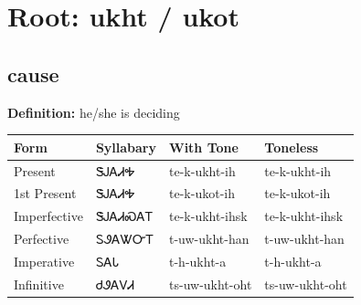 \documentclass{article}%
\begin{document}
%
\normalsize%
\section*{Root: ukht / ukot}%
\subsection*{cause}%
\textbf{Definition: }%
he/she is deciding%
\\[0.5em]%
\begin{tabular}{|l|l|l|l|}%
\hline%
\textbf{Form}&\textbf{Syllabary}&\textbf{With Tone}&\textbf{Toneless}\\%
\hline%
Present&ᏕᎫᎪᏗᎭ&te{-}k{-}ukht{-}ih&te{-}k{-}ukht{-}ih\\%
1st Present&ᏕᎫᎪᏗᎭ&te{-}k{-}ukot{-}ih&te{-}k{-}ukot{-}ih\\%
Imperfective&ᏕᎫᎪᏗᏍᎪᎢ&te{-}k{-}ukht{-}ihsk&te{-}k{-}ukht{-}ihsk\\%
Perfective&ᏚᏭᎪᏔᏅᎢ&t{-}uw{-}ukht{-}han&t{-}uw{-}ukht{-}han\\%
Imperative&ᏚᎪᏓ&t{-}h{-}ukht{-}a&t{-}h{-}ukht{-}a\\%
Infinitive&ᏧᏭᎪᏙᏗ&ts{-}uw{-}ukht{-}oht&ts{-}uw{-}ukht{-}oht\\%
\hline%
\end{tabular}%
\\[1em]%
\end{document}
